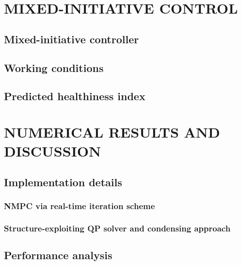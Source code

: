 \documentclass[letterpaper, 10 pt, journal, twoside]{IEEEtran}
\begin{document}
\section{MIXED-INITIATIVE CONTROL}\label{sec:algo_details}

\subsection{Mixed-initiative controller}\label{subsec:nlps}

\subsection{Working conditions}

\subsection{Predicted healthiness index}

\section{NUMERICAL RESULTS AND DISCUSSION}\label{sec:numerical_results}

\subsection{Implementation details}
\subsubsection{NMPC via real-time iteration scheme}

\subsubsection{Structure-exploiting QP solver and condensing approach}

\subsection{Performance analysis}


%
%
\end{document}
